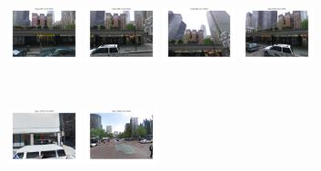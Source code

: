 \begin{figure}[t!]
\begin{minipage}{0.34\linewidth}
        \end{minipage}
        \begin{minipage}{0.75\linewidth}
            \begin{minipage}{\linewidth} 
                \colorbox{myGreen}{\includegraphics[trim = 35mm 30mm 35mm 30mm, clip=true, height=16mm]{imgs/Pval/exImproved03/improvedPval01.jpg}}
                \colorbox{myGreen}{\includegraphics[trim = 35mm 30mm 35mm 30mm, clip=true, height=16mm]{imgs/Pval/exImproved03/improvedPval02.jpg}}
                \colorbox{myGreen}{\includegraphics[trim = 35mm 30mm 35mm 30mm, clip=true, height=16mm]{imgs/Pval/exImproved03/improvedPval03.jpg}}
                \colorbox{myGreen}{\includegraphics[trim = 35mm 30mm 35mm 30mm, clip=true, height=16mm]{imgs/Pval/exImproved03/improvedPval04.jpg}}
            \end{minipage}
            \\
            \begin{minipage}{\linewidth}
                \colorbox{myRed}{\includegraphics[trim = 35mm 30mm 35mm 30mm, clip=true, height=16mm]{imgs/Pval/exImproved03/improved01.jpg}}
                \colorbox{myRed}{\includegraphics[trim = 35mm 30mm 35mm 30mm, clip=true, height=16mm]{imgs/Pval/exImproved03/improved02.jpg}}

\end{minipage}
\end{minipage}
\end{figure}
